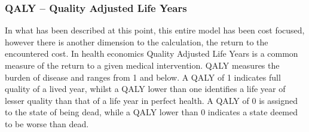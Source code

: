 \documentclass[a4paper,12pt]{article}
\begin{document}
\subsubsection*{QALY – Quality Adjusted Life Years}
In what has been described at this point, this entire model has been cost focused, however there is another dimension to the calculation, the return to the encountered cost. In health economics Quality Adjusted Life Years is a common measure of the return to a given medical intervention. QALY measures the burden of disease and ranges from 1 and below. A QALY of 1 indicates full quality of a lived year, whilst a QALY lower than one identifies a life year of lesser quality than that of a life year in perfect health. A QALY of 0 is assigned to the state of being dead, while a QALY lower than 0 indicates a state deemed to be worse than dead. 
\end{document}
